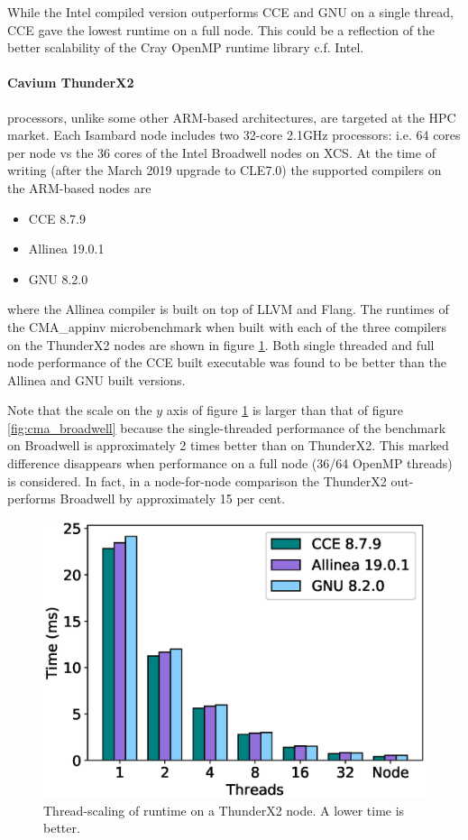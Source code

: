 While the Intel compiled version outperforms CCE and GNU on a single thread, CCE gave the lowest runtime on a full node.
This could be a reflection of the better scalability of the Cray OpenMP runtime library c.f. Intel.

\paragraph{Cavium ThunderX2} processors, unlike some other ARM-based architectures, are targeted at the HPC market.
Each Isambard node includes two 32-core 2.1GHz processors: i.e. 64 cores per node vs the 36 cores of the Intel Broadwell nodes on XCS.
At the time of writing (after the March 2019 upgrade to CLE7.0) the supported compilers on the ARM-based nodes are
\begin{itemize}
\item CCE 8.7.9
\item Allinea 19.0.1
\item GNU 8.2.0
\end{itemize}
where the Allinea compiler is built on top of LLVM and Flang.
The runtimes of the CMA\_appinv microbenchmark when built with each of the three compilers on the ThunderX2 nodes are shown in figure \ref{fig:cma_tx2}.
Both single threaded and full node performance of the CCE built executable was found to be better than the Allinea and GNU built versions.

Note that the scale on the $y$ axis of figure \ref{fig:cma_tx2} is larger than that of figure \ref{fig:cma_broadwell} because the single-threaded performance of the benchmark on Broadwell is approximately 2 times better than on ThunderX2.
This marked difference disappears when performance on a full node (36/64 OpenMP threads) is considered.
In fact, in a node-for-node comparison the ThunderX2 out-performs Broadwell by approximately 15 per cent.


\begin{figure}
\centering\includegraphics[scale=0.5]{figs/ThunderX2_microbenchmark_vanilla.eps}
\caption{Thread-scaling of runtime on a ThunderX2 node. A lower time is better.}
\label{fig:cma_tx2}
\end{figure}

